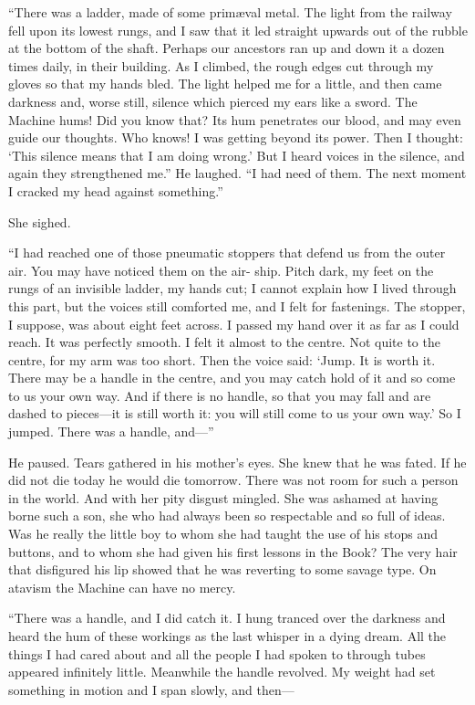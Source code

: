 ``There was a ladder, made of some prim\ae val metal. The light from the railway fell upon its lowest rungs, and I saw that it led straight upwards out of the rubble at the bottom of the shaft. Perhaps our ancestors ran up and down it a dozen times daily, in their building. As I climbed, the rough edges cut through my gloves so that my hands bled. The light helped me for a little, and then came darkness and, worse still, silence which pierced my ears like a sword. The Machine hums! Did you know that? Its hum penetrates our blood, and may even guide our thoughts. Who knows! I was getting beyond its power. Then I thought: `This silence means that I am doing wrong.' But I heard voices in the silence, and again they strengthened me.'' He laughed. ``I had need of them. The next moment I cracked my head against something.''

She sighed.

``I had reached one of those pneumatic stoppers that defend us from the outer air. You may have noticed them on the air- ship. Pitch dark, my feet on the rungs of an invisible ladder, my hands cut; I cannot explain how I lived through this part, but the voices still comforted me, and I felt for fastenings. The stopper, I suppose, was about eight feet across. I passed my hand over it as far as I could reach. It was perfectly smooth. I felt it almost to the centre. Not quite to the centre, for my arm was too short. Then the voice said: `Jump. It is worth it. There may be a handle in the centre, and you may catch hold of it and so come to us your own way. And if there is no handle, so that you may fall and are dashed to pieces---it is still worth it: you will still come to us your own way.' So I jumped. There was a handle, and---''

He paused. Tears gathered in his mother's eyes. She knew that he was fated. If he did not die today he would die tomorrow. There was not room for such a person in the world. And with her pity disgust mingled. She was ashamed at having borne such a son, she who had always been so respectable and so full of ideas. Was he really the little boy to whom she had taught the use of his stops and buttons, and to whom she had given his first lessons in the Book? The very hair that disfigured his lip showed that he was reverting to some savage type. On atavism the Machine can have no mercy.

``There was a handle, and I did catch it. I hung tranced over the darkness and heard the hum of these workings as the last whisper in a dying dream. All the things I had cared about and all the people I had spoken to through tubes appeared infinitely little. Meanwhile the handle revolved. My weight had set something in motion and I span slowly, and then---

